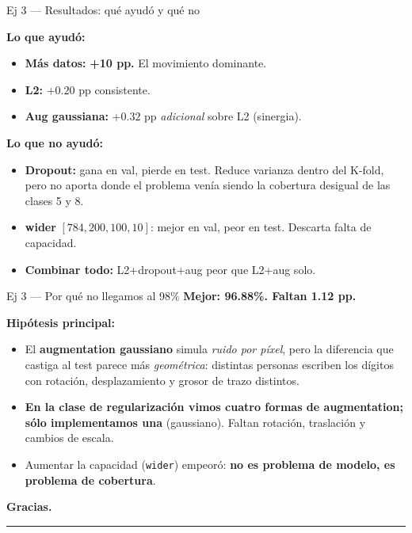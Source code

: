 \documentclass[11pt,aspectratio=169]{beamer}
\newcommand{\code}[1]{\texttt{\textcolor{accent}{#1}}}
\begin{document}
\begin{frame}{Ej 3 — Resultados: qué ayudó y qué no}
\begin{insight}
\textbf{Lo que ayudó:}
\begin{itemize}
  \item \textbf{Más datos:} \textbf{+10 pp.} El movimiento dominante.
  \item \textbf{L2:} $+0.20$ pp consistente.
  \item \textbf{Aug gaussiana:} $+0.32$ pp \emph{adicional} sobre L2 (sinergia).
\end{itemize}
\end{insight}

\begin{warning}
\textbf{Lo que no ayudó:}
\begin{itemize}\setlength\itemsep{0.1em}
  \item \textbf{Dropout:} gana en val, pierde en test. Reduce varianza dentro del K-fold, pero no aporta donde el problema venía siendo la cobertura desigual de las clases 5 y 8.
  \item \textbf{wider} \([784,200,100,10]\): mejor en val, peor en test. Descarta falta de capacidad.
  \item \textbf{Combinar todo:} L2+dropout+aug peor que L2+aug solo.
\end{itemize}
\end{warning}
\end{frame}

\begin{frame}{Ej 3 — Por qué no llegamos al 98\%}
\centering
\Large \textcolor{warn}{\textbf{Mejor: 96.88\%. Faltan 1.12 pp.}}\\[0.8em]

\normalsize\raggedright
\textbf{Hipótesis principal:}
\begin{itemize}\setlength\itemsep{0.3em}
  \item El \textbf{augmentation gaussiano} simula \emph{ruido por píxel}, pero la diferencia que castiga al test parece más \emph{geométrica}: distintas personas escriben los dígitos con rotación, desplazamiento y grosor de trazo distintos.
  \item \textbf{En la clase de regularización vimos cuatro formas de augmentation; sólo implementamos una} (gaussiano). Faltan rotación, traslación y cambios de escala.
  \item Aumentar la capacidad (\code{wider}) empeoró: \textbf{no es problema de modelo, es problema de cobertura}.
\end{itemize}
\end{frame}

{
\begin{frame}[plain]
\centering
\vspace*{2cm}
\color{white}
{\fontsize{36}{42}\selectfont\bfseries Gracias.}\\[2.5em]

\textcolor{white!75}{\rule{6cm}{0.4pt}}
\end{frame}
}
\end{document}
